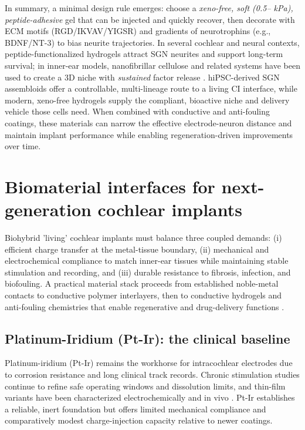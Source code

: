 \documentclass[referee,pdflatex, sn-vancouver-num]{sn-jnl}%
\theoremstyle{thmstyleone}%
\theoremstyle{thmstyletwo}%
\theoremstyle{thmstylethree}%
\DeclareRobustCommand{\textendash}{\ifmmode\text{-}\else\leavevmode\hbox{--}\fi}
\begin{document}
In summary, a minimal design rule emerges: choose a \emph{xeno-free, soft (0.5\textendash3 kPa), peptide-adhesive} gel that can be injected and quickly recover, then decorate with ECM motifs (RGD/IKVAV/YIGSR) and gradients of neurotrophins (e.g., BDNF/NT-3) to bias neurite trajectories. In several cochlear and neural contexts, peptide-functionalized hydrogels attract SGN neurites and support long-term survival; in inner-ear models, nanofibrillar cellulose and related systems have been used to create a 3D niche with \emph{sustained} factor release \citep{Pancratov2017ColSurfB,Chang2020ActaBiomaterialia}.  hiPSC-derived SGN assembloids offer a controllable, multi-lineage route to a living CI interface, while modern, xeno-free hydrogels supply the compliant, bioactive niche and delivery vehicle those cells need. When combined with conductive and anti-fouling coatings, these materials can narrow the effective electrode-neuron distance and maintain implant performance while enabling regeneration-driven improvements over time.

\section{Biomaterial interfaces for next-generation cochlear implants}\label{sec5}
Biohybrid 'living' cochlear implants must balance three coupled demands: (i) efficient charge transfer at the metal-tissue boundary, (ii) mechanical and electrochemical compliance to match inner-ear tissues while maintaining stable stimulation and recording, and (iii) durable resistance to fibrosis, infection, and biofouling. A practical material stack proceeds from established noble-metal contacts to conductive polymer interlayers, then to conductive hydrogels and anti-fouling chemistries that enable regenerative and drug-delivery functions \cite{CarnicerLombarte2024AdvMat}.

\subsection{Platinum-Iridium (Pt-Ir): the clinical baseline}
Platinum-iridium (Pt-Ir) remains the workhorse for intracochlear electrodes due to corrosion resistance and long clinical track records. Chronic stimulation studies continue to refine safe operating windows and dissolution limits, and thin-film variants have been characterized electrochemically and in vivo \cite{Shepherd2020,Dalrymple2020, Vecchi2024}. Pt-Ir establishes a reliable, inert foundation but offers limited mechanical compliance and comparatively modest charge-injection capacity relative to newer coatings.
\end{document}
